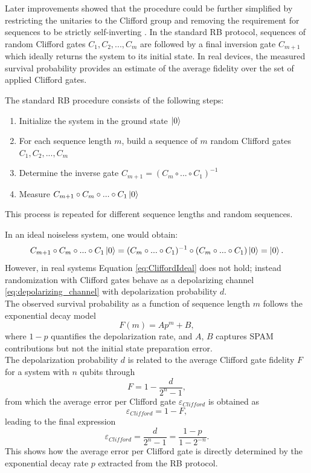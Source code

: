 Later improvements showed that the procedure could be further simplified by restricting the unitaries to the Clifford group and removing the requirement for sequences to be strictly self-inverting \cite{knill_randomized_2008}.
In the standard RB protocol, sequences of random Clifford gates $C_1, C_2, ..., C_m$ are followed by a final inversion gate $C_{m+1}$ which ideally returns the system to its initial state. 
In real devices, the measured survival probability provides an estimate of the average fidelity over the set of applied Clifford gates.

The standard RB procedure consists of the following steps:
\begin{enumerate}\label{routine:RB}
    \item Initialize the system in the ground state $\ket{0}$
    \item For each sequence length $m$, build a sequence of $m$ random Clifford gates $C_1, C_2, ..., C_m$
    \item Determine the inverse gate $C_{m+1}=(C_m\circ...\circ C_1)^{-1}$
    \item Measure $C_{m+1}\circ C_m \circ ...\circ C_1 \ket{0}$
\end{enumerate}
This process is repeated for different sequence lengths and random sequences.

In an ideal noiseless system, one would obtain:
\begin{equation}\label{eq:CliffordIdeal}
    C_{m+1}\circ C_m \circ ...\circ C_1 \ket{0} = (C_m\circ...\circ C_1)^{-1}\circ(C_m\circ...\circ C_1)\ket{0} = \ket{0}.
\end{equation}
However, in real systems Equation \ref{eq:CliffordIdeal} does not hold; instead randomization with Clifford gates behave as a depolarizing channel \ref{eq:depolarizing_channel} with depolarization probability $d$.\\
The observed survival probability as a function of sequence length $m$ follows the exponential decay model
\begin{equation}\label{eq:RB_decay}
    F(m) = Ap^m +B,
\end{equation}
where $1-p$ quantifies the depolarization rate, and $A$, $B$ captures SPAM contributions but not the initial state preparation error.\\
The depolarization probability $d$ is related to the average Clifford gate fidelity $F$ for a system with $n$ qubits through
\begin{equation}
    F = 1 - \frac{d}{2^n - 1}\label{eq:average_gate_fidelity},
\end{equation}
from which the average error per Clifford gate $\varepsilon_{Clifford}$ is obtained as
\begin{equation}
    \varepsilon_{Clifford} = 1 - F \label{eq:avg_error_Clifford_gate},
\end{equation}
leading to the final expression
\begin{equation}
    \varepsilon_{Clifford} = \frac{d}{2^n -1} = \frac{1-p}{1-2^{-n}}.
\end{equation}
This shows how the average error per Clifford gate is directly determined by the exponential decay rate $p$ extracted from the RB protocol.


